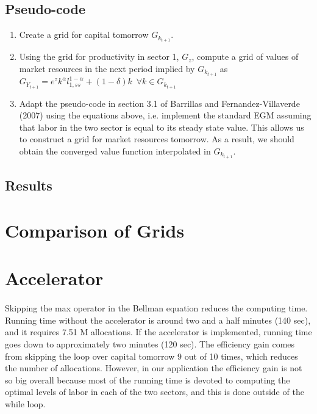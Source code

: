 \documentclass[11pt,a4paper]{article}
\begin{document}
\subsection*{Pseudo-code}
\begin{enumerate}
\item Create a grid for capital tomorrow $G_{k_{t+1}}$.
\item Using the grid for productivity in sector 1, $G_z$, compute a grid of values of market resources in the next period implied by $G_{k_{t+1}}$ as $G_{Y_{t+1}} = e^z k^{\alpha} l_{1,ss}^{1-\alpha} + (1-\delta) k \:\; \forall k \in G_{k_{t+1}}$
\item Adapt the pseudo-code in section 3.1 of Barrillas and Fernandez-Villaverde (2007) using the equations above, i.e. implement the standard EGM assuming that labor in the two sector is equal to its steady state value. This allows us to construct a grid for market resources tomorrow. As a result, we should obtain the converged value function interpolated in $G_{k_{t+1}}$.
\end{enumerate}

\subsection*{Results}

\section{Comparison of Grids}

\section{Accelerator}
\paragraph{} Skipping the max operator in the Bellman equation reduces the computing time. Running time without the accelerator is around two and a half minutes (140 sec), and it requires 7.51 M allocations. If the accelerator is implemented, running time goes down to approximately two minutes (120 sec). The efficiency gain comes from skipping the loop over capital tomorrow 9 out of 10 times, which reduces the number of allocations. However, in our application the efficiency gain is not so big overall because most of the running time is devoted to computing the optimal levels of labor in each of the two sectors, and this is done outside of the while loop. 
\end{document}
